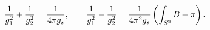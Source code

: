 \begin{equation}
{1\over g_{1}^2} + {1\over g_{2}^2}= {1\over 4\pi g_{s}},\qquad
{1\over g_{1}^2} - {1\over g_{2}^2}= {1\over 4\pi^2 g_{s}}\left(\int_{S^2}B-\pi 
\right) .
\label{pip}
\end{equation}

